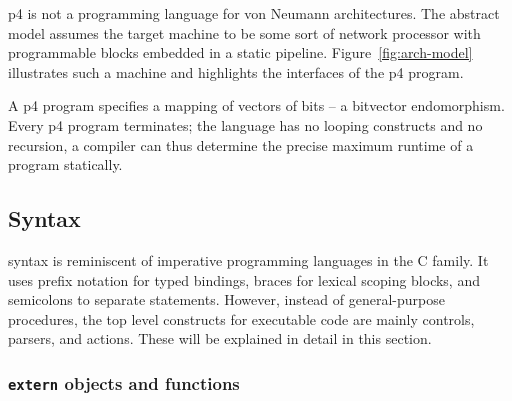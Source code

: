 \acrshort{p4} is not a programming language for von Neumann architectures. The
abstract model assumes the target machine to be some sort of network processor
with programmable blocks embedded in a static pipeline.
Figure~\ref{fig:arch-model} illustrates such a machine and highlights the
interfaces of the \acrshort{p4} program.

A \acrshort{p4} program specifies a mapping of vectors of bits -- a bit\-vector
endomorphism. Every \acrshort{p4} program terminates; the language has no
looping constructs and no recursion, a compiler can thus determine the precise
maximum runtime of a program statically.


\subsection{Syntax}




\pfs syntax is reminiscent of imperative programming languages in the C family.
It uses prefix notation for typed bindings, braces for lexical scoping blocks,
and semicolons to separate statements. However, instead of general-purpose
procedures, the top level constructs for executable code are mainly controls,
parsers, and actions. These will be explained in detail in this section.

\subsubsection*{\texttt{extern} objects and functions}

